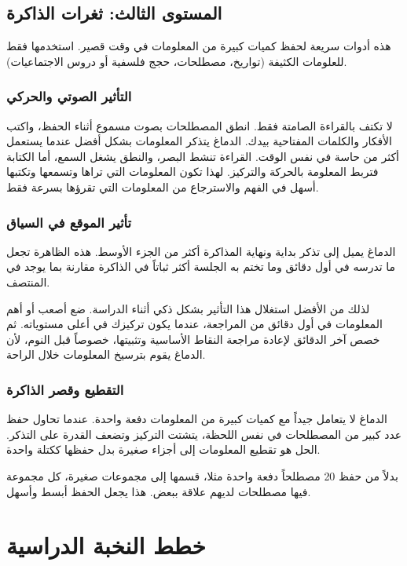 \documentclass[12pt,a4paper]{book}
\begin{document}
	\section{المستوى الثالث: ثغرات الذاكرة}
	
	هذه أدوات سريعة لحفظ كميات كبيرة من المعلومات في وقت قصير. استخدمها فقط للعلومات الكثيفة (تواريخ، مصطلحات، حجج فلسفية أو دروس الاجتماعيات).
	
\subsection{التأثير الصوتي والحركي}

لا تكتف بالقراءة الصامتة فقط. انطق المصطلحات بصوت مسموع أثناء الحفظ، واكتب الأفكار والكلمات المفتاحية بيدك. الدماغ يتذكر المعلومات بشكل أفضل عندما يستعمل أكثر من حاسة في نفس الوقت. القراءة تنشط البصر، والنطق يشغل السمع، أما الكتابة فتربط المعلومة بالحركة والتركيز. لهذا تكون المعلومات التي تراها وتسمعها وتكتبها أسهل في الفهم والاسترجاع من المعلومات التي تقرؤها بسرعة فقط.

\subsection{تأثير الموقع في السياق}

الدماغ يميل إلى تذكر بداية ونهاية المذاكرة أكثر من الجزء الأوسط. هذه الظاهرة تجعل ما تدرسه في أول دقائق وما تختم به الجلسة أكثر ثباتاً في الذاكرة مقارنة بما يوجد في المنتصف.

لذلك من الأفضل استغلال هذا التأثير بشكل ذكي أثناء الدراسة. ضع أصعب أو أهم المعلومات في أول دقائق من المراجعة، عندما يكون تركيزك في أعلى مستوياته. ثم خصص آخر الدقائق لإعادة مراجعة النقاط الأساسية وتثبيتها، خصوصاً قبل النوم، لأن الدماغ يقوم بترسيخ المعلومات خلال الراحة.

\subsection{التقطيع وقصر الذاكرة}

الدماغ لا يتعامل جيداً مع كميات كبيرة من المعلومات دفعة واحدة. عندما تحاول حفظ عدد كبير من المصطلحات في نفس اللحظة، يتشتت التركيز وتضعف القدرة على التذكر. الحل هو تقطيع المعلومات إلى أجزاء صغيرة بدل حفظها ككتلة واحدة.

بدلاً من حفظ 20 مصطلحاً دفعة واحدة مثلا، قسمها إلى مجموعات صغيرة، كل مجموعة فيها مصطلحات لديهم علاقة ببعض. هذا يجعل الحفظ أبسط وأسهل.
	
	\chapter{خطط النخبة الدراسية}
	\label{chap:plans}
	
\end{document}
